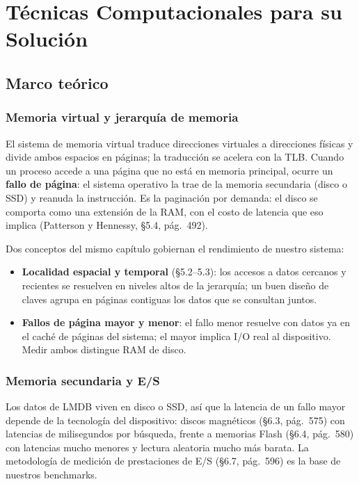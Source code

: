 \documentclass[12pt, letterpaper]{article}
\begin{document}
\section{Técnicas Computacionales para su Solución}

\subsection{Marco teórico}

\subsubsection{Memoria virtual y jerarquía de memoria}

El sistema de memoria virtual traduce direcciones virtuales a direcciones
físicas y divide ambos espacios en páginas; la traducción se acelera con la
TLB. Cuando un proceso accede a una página que no está en memoria principal,
ocurre un \textbf{fallo de página}: el sistema operativo la trae de la
memoria secundaria (disco o SSD) y reanuda la instrucción. Es la paginación
por demanda: el disco se comporta como una extensión de la RAM, con el costo
de latencia que eso implica (Patterson y Hennessy, §5.4, pág.~492).

Dos conceptos del mismo capítulo gobiernan el rendimiento de nuestro sistema:
\begin{itemize}
    \item \textbf{Localidad espacial y temporal} (§5.2--5.3): los accesos a
    datos cercanos y recientes se resuelven en niveles altos de la jerarquía;
    un buen diseño de claves agrupa en páginas contiguas los datos que se
    consultan juntos.
    \item \textbf{Fallos de página mayor y menor}: el fallo menor resuelve
    con datos ya en el caché de páginas del sistema; el mayor implica I/O
    real al dispositivo. Medir ambos distingue RAM de disco.
\end{itemize}

\subsubsection{Memoria secundaria y E/S}

Los datos de LMDB viven en disco o SSD, así que la latencia de un fallo mayor
depende de la tecnología del dispositivo: discos magnéticos (§6.3,
pág.~575) con latencias de milisegundos por búsqueda, frente a memorias
Flash (§6.4, pág.~580) con latencias mucho menores y lectura aleatoria mucho
más barata. La metodología de medición de prestaciones de E/S (§6.7,
pág.~596) es la base de nuestros benchmarks.
\end{document}
